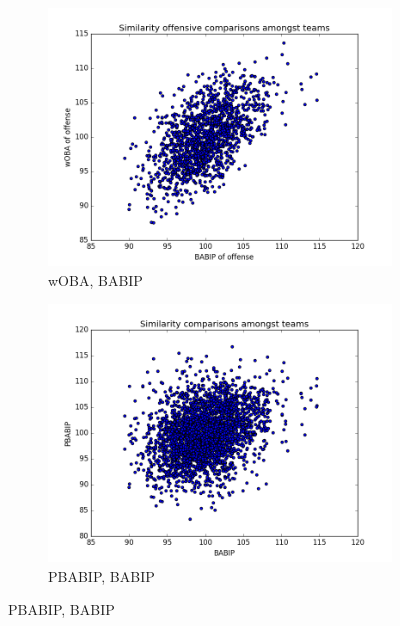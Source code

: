 \documentclass[12pt]{article}
\numberwithin{equation}{subsection}
\begin{document}
\begin{figure}[H] 
  \begin{subfigure}[b]{0.5\linewidth}
    \centering
    \includegraphics[width=0.9\linewidth]{Sim7} 
    \caption{wOBA, BABIP} 
    \label{fig5:a} 
    \vspace{4ex}
  \end{subfigure}%
  \begin{subfigure}[b]{0.5\linewidth}
    \centering
    \includegraphics[width=0.9\linewidth]{Sim8} 
    \caption{PBABIP, BABIP} 
    \label{fig5:b} 
    \vspace{4ex}
  \end{subfigure} 
  

\end{figure}
\end{document}
